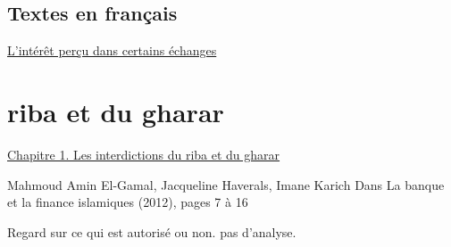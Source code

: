  
 \subsection{Textes en français}
 \href{https://www.maison-islam.com/articles/?p=293}{L'intérêt perçu dans certains échanges}
  
  \section{riba et du gharar}
  \href{https://www.cairn.info/la-banque-et-la-finance-islamiques--9782804167042-page-7.htm}{Chapitre 1. Les interdictions du riba et du gharar}
  
Mahmoud Amin El-Gamal, Jacqueline Haverals, Imane Karich
Dans La banque et la finance islamiques (2012), pages 7 à 16
\begin{Synthesis}
 Regard sur ce qui est autorisé ou non. pas d'analyse.
\end{Synthesis}
